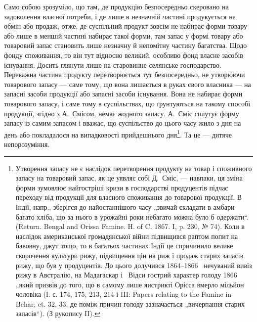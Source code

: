 Само собою зрозуміло, що там, де продукцію безпосередньо скеровано
на задоволення власної потреби, і де лише в незначній частині
продукується на обмін або продаж, отже, де суспільний продукт зовсім
не набирає форми товару або лише в меншій частині набирає такої форми,
там запас у формі товару або товаровий запас становить лише незначну
й непомітну частину багатства. Щодо фонду споживання, то він
тут відносно великий, особливо фонд власне засобів існування. Досить
глянути лише на старовинне селянське господарство. Переважна частина продукту
перетворюється тут безпосередньо, не утворюючи товарового запасу
— саме тому, що вона лишається в руках свого власника — на запасні
засоби продукції або запасні засоби існування. Вона не набирає форми
товарового запасу, і саме тому в суспільствах, що ґрунтуються на такому
способі продукції, згідно з А.~Смісом, немає жодного запасу. А.~Сміс
сплутує форму запасу із самим запасом і вважає, що суспільство до
цього часу жило з дня на день або покладалося на випадковості прийдешнього
дня\footnote{
Утворення\label{original-94} запасу не є наслідок перетворення продукту на товар і споживного запасу на товаровий
запас, як це уявляє собі Д.~Сміс, — навпаки,
ця зміна форми зумовлює найгостріші кризи в господарстві продуцентів підчас
переходу від продукції для власного споживання до товарової продукції. В Індії,
напр., зберігся до найостаннішого часу „звичай складати в амбари багато хліба, що
за нього в урожайні роки небагато можна було б одержати“. (Return. Bengal and
Orissa Famine. H. of C. 1867. I, p. 230, № 74). Коли в наслідок американської
громадянської війни підвищився раптом попит на бавовну, джут тощо, то в багатьох
частинах Індії це спричинило велике скорочення культури рижу, підвищення цін
на риж і продаж старих запасів рижу, що був у продуцентів. До цього долучився
1864--1866~ нечуваний вивіз рижу в Австралію, на Мадагаскар і~ Відси
гострий характер голоду 1866~ „який призвів до того, що в самому лише
яистрикті Орісса вмерло мільйон чоловіка (І. с. 174, 175, 213, 214 і III: Papers relating
to the Famine in Behar; ct. 32, 33, де поміж причин голоду зазначається „вичерпання старих запасів“).
(З рукопису II).
}. Та це — дитяче непорозуміння.
